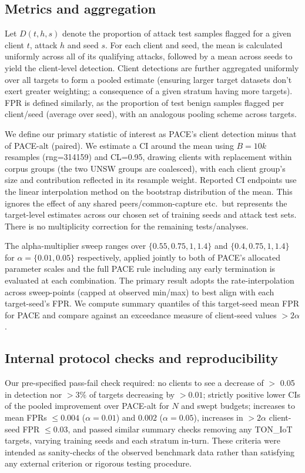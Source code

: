 \subsection{Metrics and aggregation} 
Let $D(t,h,s)$ denote the proportion of attack test samples flagged for a given client $t$, attack $h$ and seed $s$. For each client and seed, the mean is calculated uniformly across all of its qualifying attacks, followed by a mean across seeds to yield the client-level detection. Client detections are further aggregated uniformly over all targets to form a pooled estimate (ensuring larger target datasets don't exert greater weighting; a consequence of a given stratum having more targets). FPR is defined similarly, as the proportion of test benign samples flagged per client/seed (average over seed), with an analogous pooling scheme across targets.

We define our primary statistic of interest as PACE's client detection minus that of PACE-alt (paired). We estimate a CI around the mean using $B=10k$ resamples (rng=314159) and CL=0.95, drawing clients with replacement within corpus groups (the two UNSW groups are coalesced), with each client group's size and contribution reflected in its resample weight. Reported CI endpoints use the linear interpolation method on the bootstrap distribution of the mean. This ignores the effect of any shared peers/common-capture etc.\ but represents the target-level estimates across our chosen set of training seeds and attack test sets. There is no multiplicity correction for the remaining tests/analyses.

The alpha-multiplier sweep ranges over $\{0.55, 0.75, 1, 1.4\}$ and $\{0.4, 0.75, 1, 1.4\}$ for $\alpha=\{0.01, 0.05\}$ respectively, applied jointly to both of PACE's allocated parameter scales and the full PACE rule including any early termination is evaluated at each combination. The primary result adopts the rate-interpolation across sweep-points (capped at observed min/max) to best align with each target-seed's FPR. We compute summary quantiles of this target-seed mean FPR for PACE and compare against an exceedance measure of client-seed values $>2\alpha$.

\subsection{Internal protocol checks and reproducibility} 
\label{sec:protocol-history} 
Our pre-specified pass-fail check required: no clients to see a decrease of $>$ 0.05 in detection nor $>3\%$ of targets decreasing by $>0.01$; strictly positive lower CIs of the pooled improvement over PACE-alt for $N$ and swept budgets; increases to mean FPRs $\leq 0.004$ ($\alpha=0.01$) and $0.002$ ($\alpha=0.05$), increases in $>2\alpha$ client-seed FPR $\leq 0.03$, and passed similar summary checks removing any TON\_IoT targets, varying training seeds and each stratum in-turn. These criteria were intended as sanity-checks of the observed benchmark data rather than satisfying any external criterion or rigorous testing procedure.

